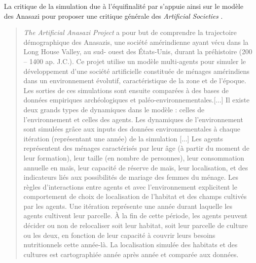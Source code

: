 

La critique de la simulation due à l’équifinalité par \textcite{Yanoff2008}  s’appuie ainsi sur le modèle des Anasazi \autocites{Dean2000, Axtell2002} pour proposer une critique générale des \textit{Artificial Societies} .

\blockquote[{\cite[326-327]{Schmitt2014}}]{\textit{The Artificial Anasazi Project} a pour but de comprendre la trajectoire démographique des Anasazis, une société amérindienne ayant vécu dans la Long House Valley, au sud- ouest des États-Unis, durant la préhistoire (200 – 1400 ap. J.C.). Ce projet utilise un modèle multi-agents pour simuler le développement d’une société artificielle constituée de ménages amérindiens dans un environnement évolutif, caractéristique de la zone et de l’époque. Les sorties de ces simulations sont ensuite comparées à des bases de données empiriques archéologiques et paléo-environnementales.[...] Il existe deux grands types de dynamiques dans le modèle : celles de l’environnement et celles des agents. Les dynamiques de l’environnement sont simulées grâce aux inputs des données environnementales à chaque itération (représentant une année) de la simulation [...] Les agents représentent des ménages caractérisés par leur âge (à partir du moment de leur formation), leur taille (en nombre de personnes), leur consommation annuelle en maïs, leur capacité de réserve de maïs, leur localisation, et des indicateurs liés aux possibilités de mariage des femmes du ménage. Les règles d’interactions entre agents et avec l’environnement explicitent le comportement de choix de localisation de l’habitat et des champs cultivés par les agents. Une itération représente une année durant laquelle les agents cultivent leur parcelle. À la fin de cette période, les agents peuvent décider ou non de relocaliser soit leur habitat, soit leur parcelle de culture ou les deux, en fonction de leur capacité à couvrir leurs besoins nutritionnels cette année-là. La localisation simulée des habitats et des cultures est cartographiée année après année et comparée aux données.}

